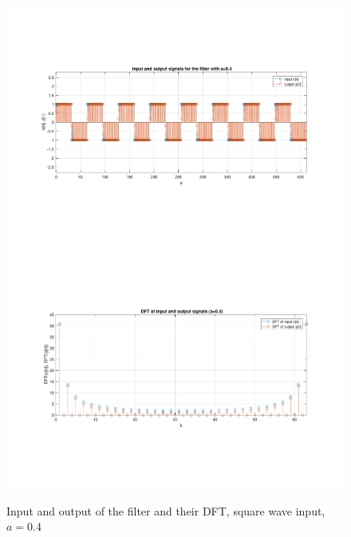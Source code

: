 \begin{figure} [H]
	\centering
	\includegraphics[trim={2.5cm 5cm 2.5cm 5cm}, clip, width=0.75\linewidth]{io_sw_5}
	\includegraphics[trim={2.5cm 5cm 2.5cm 5cm}, clip, width=0.75\linewidth]{dft_sw_5}
	\caption{Input and output of the filter and their DFT, square wave input, $a=0.4$}
	\label{fig:t1_io_sw_5}
\end{figure}
